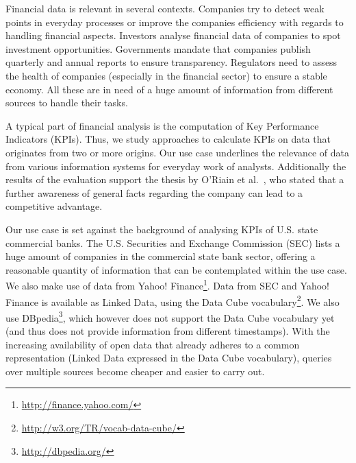 \documentclass[runningheads]{llncs}
\begin{document}
Financial data is relevant in several contexts.
Companies try to detect weak points in everyday processes or improve the companies efficiency with regards to handling financial aspects.
Investors analyse financial data of companies to spot investment opportunities.
Governments mandate that companies publish quarterly and annual reports to ensure transparency.
Regulators need to assess the health of companies (especially in the financial sector) to ensure a stable economy.
All these are in need of a huge amount of information from different sources to handle their tasks.

A typical part of financial analysis is the computation of Key Performance Indicators (KPIs).
Thus, we study approaches to calculate KPIs on data that originates from two or more origins.
Our use case underlines the relevance of data from various information systems for everyday work of analysts.
Additionally the results of the evaluation support the thesis by O'Riain et al.~\cite{OCH12}, who stated that a further awareness of general facts regarding the company can lead to a competitive advantage.

Our use case is set against the background of analysing KPIs of U.S. state commercial banks.
The U.S. Securities and Exchange Commission (SEC) lists a huge amount of companies in the commercial state bank sector, offering a reasonable quantity of information that can be contemplated within the use case.
We also make use of data from Yahoo! Finance\footnote{\url{http://finance.yahoo.com/}}.
Data from SEC and Yahoo! Finance is available as Linked Data, using the Data Cube vocabulary\footnote{\url{http://w3.org/TR/vocab-data-cube/}}.
We also use DBpedia\footnote{\url{http://dbpedia.org/}}, which however does not support the Data Cube vocabulary yet (and thus does not provide information from different timestamps).
With the increasing availability of open data that already adheres to a common representation (Linked Data expressed in the Data Cube vocabulary), queries over multiple sources become cheaper and easier to carry out.
\end{document}
